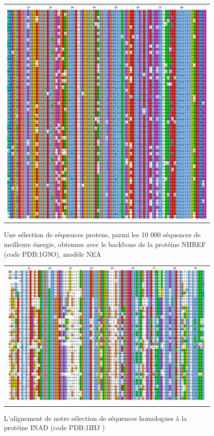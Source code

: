    \begin{figure}[t]
     \centering
     \begin{tabular}{c}
       \includegraphics[width=17cm]{proteus/1G9O.png} \\
     \end{tabular}
       \caption{Une sélection de séquences proteus, parmi les 10 000 séquences de meilleure énergie, obtenues avec le backbone de la protéine NHREF (code PDB:1G9O), modèle NEA}
\label{align_proteus:NHREF}
   \end{figure}

\clearpage

   \begin{figure}[t]
     \centering
     \begin{tabular}{c}
       \includegraphics[width=17cm]{homologues/1IHJ.png} \\
     \end{tabular}
     \caption{L'alignement de notre sélection de séquences homologues à la protéine INAD (code PDB:1IHJ )}
\label{align_homo:INAD}
   \end{figure}

